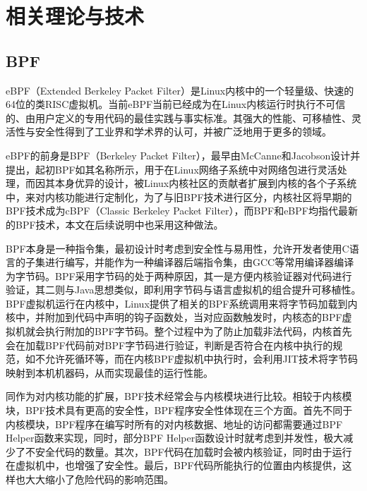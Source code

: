 \chapter{相关理论与技术}\label{chap:theories_tech}


\section{BPF}

eBPF（Extended Berkeley Packet Filter）是Linux内核中的一个轻量级、快速的64位的类RISC虚拟机\citep{sharaf2022extended}。当前eBPF当前已经成为在Linux内核运行时执行不可信的、由用户定义的专用代码的最佳实践与事实标准。其强大的性能、可移植性、灵活性与安全性得到了工业界和学术界的认可，并被广泛地用于更多的领域。

eBPF的前身是BPF（Berkeley Packet Filter），最早由McCanne和Jacobson设计并提出\citep{mccanne1993bsd}，起初BPF如其名称所示，用于在Linux网络子系统中对网络包进行灵活处理，而因其本身优异的设计，被Linux内核社区的贡献者扩展到内核的各个子系统中，来对内核功能进行定制化，为了与旧BPF技术进行区分，内核社区将早期的BPF技术成为cBPF（Classic Berkeley Packet Filter），而BPF和eBPF均指代最新的BPF技术，本文在后续说明中也采用这种做法。

BPF本身是一种指令集，最初设计时考虑到安全性与易用性，允许开发者使用C语言的子集进行编写，并能作为一种编译器后端指令集，由GCC等常用编译器编译为字节码\citep{ebpfguidence}。BPF采用字节码的处于两种原因，其一是方便内核验证器对代码进行验证，其二则与Java思想类似，即利用字节码与语言虚拟机的组合提升可移植性。BPF虚拟机运行在内核中，Linux提供了相关的BPF系统调用来将字节码加载到内核中，并附加到代码中声明的钩子函数处，当对应函数触发时，内核态的BPF虚拟机就会执行附加的BPF字节码。整个过程中为了防止加载非法代码，内核首先会在加载BPF代码前对BPF字节码进行验证，判断是否符合在内核中执行的规范，如不允许死循环等，而在内核BPF虚拟机中执行时，会利用JIT技术将字节码映射到本机机器码，从而实现最佳的运行性能。

同作为对内核功能的扩展，BPF技术经常会与内核模块进行比较。相较于内核模块，BPF技术具有更高的安全性，BPF程序安全性体现在三个方面。首先不同于内核模块，BPF程序在编写时所有的对内核数据、地址的访问都需要通过BPF Helper函数来实现，同时，部分BPF Helper函数设计时就考虑到并发性，极大减少了不安全代码的数量。其次，BPF代码在加载时会被内核验证，同时由于运行在虚拟机中，也增强了安全性。最后，BPF代码所能执行的位置由内核提供，这样也大大缩小了危险代码的影响范围。


